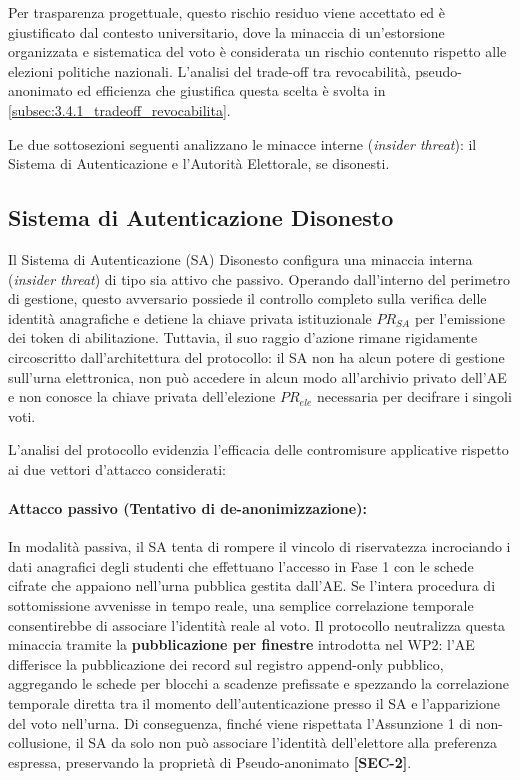 Per trasparenza progettuale, questo rischio residuo viene accettato ed è giustificato dal contesto universitario, dove la minaccia di un'estorsione organizzata e sistematica del voto è considerata un rischio contenuto rispetto alle elezioni politiche nazionali. L'analisi del trade-off tra revocabilità, pseudo-anonimato ed efficienza che giustifica questa scelta è svolta in \ref{subsec:3.4.1_tradeoff_revocabilita}.

Le due sottosezioni seguenti analizzano le minacce interne (\textit{insider threat}): il Sistema di Autenticazione e l'Autorità Elettorale, se disonesti.

\subsection{Sistema di Autenticazione Disonesto}
\label{subsec:3.2.6_sa_disonesto}

Il Sistema di Autenticazione (SA) Disonesto configura una minaccia interna (\textit{insider threat}) di tipo sia attivo che passivo. Operando dall'interno del perimetro di gestione, questo avversario possiede il controllo completo sulla verifica delle identità anagrafiche e detiene la chiave privata istituzionale $PR_{SA}$ per l'emissione dei token di abilitazione. Tuttavia, il suo raggio d'azione rimane rigidamente circoscritto dall'architettura del protocollo: il SA non ha alcun potere di gestione sull'urna elettronica, non può accedere in alcun modo all'archivio privato dell'AE e non conosce la chiave privata dell'elezione $PR_{ele}$ necessaria per decifrare i singoli voti.

L'analisi del protocollo evidenzia l'efficacia delle contromisure applicative rispetto ai due vettori d'attacco considerati:

\paragraph{Attacco passivo (Tentativo di de-anonimizzazione):} In modalità passiva, il SA tenta di rompere il vincolo di riservatezza incrociando i dati anagrafici degli studenti che effettuano l'accesso in Fase 1 con le schede cifrate che appaiono nell'urna pubblica gestita dall'AE. Se l'intera procedura di sottomissione avvenisse in tempo reale, una semplice correlazione temporale consentirebbe di associare l'identità reale al voto. Il protocollo neutralizza questa minaccia tramite la \textbf{pubblicazione per finestre} introdotta nel WP2: l'AE differisce la pubblicazione dei record sul registro append-only pubblico, aggregando le schede per blocchi a scadenze prefissate e spezzando la correlazione temporale diretta tra il momento dell'autenticazione presso il SA e l'apparizione del voto nell'urna. Di conseguenza, finché viene rispettata l'Assunzione 1 di non-collusione, il SA da solo non può associare l'identità dell'elettore alla preferenza espressa, preservando la proprietà di Pseudo-anonimato \textbf{[SEC-2]}.

